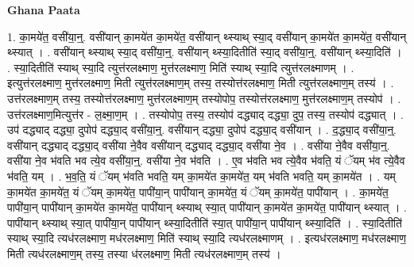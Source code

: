 \documentclass[17pt]{extarticle}
\begin{document}
\textbf{Ghana Paata } \newline

1. का॒मये॑त॒ वसी॑या॒न्॒. वसी॑यान् का॒मये॑त का॒मये॑त॒ वसी॑यान् थ्स्याथ् स्या॒द् वसी॑यान् का॒मये॑त का॒मये॑त॒ वसी॑यान् थ्स्यात् । . वसी॑यान् थ्स्याथ् स्या॒द् वसी॑या॒न्॒. वसी॑यान् थ्स्या॒दितीति॑ स्या॒द् वसी॑या॒न्॒. वसी॑यान् थ्स्या॒दिति॑ । . स्या॒दितीति॑ स्याथ् स्या॒दि त्युत्त॑रलक्ष्माण॒ मुत्त॑रलक्ष्माण॒ मिति॑ स्याथ् स्या॒दि त्युत्त॑रलक्ष्माणम् । . इत्युत्त॑रलक्ष्माण॒ मुत्त॑रलक्ष्माण॒ मिती त्युत्त॑रलक्ष्माण॒म् तस्य॒ तस्योत्त॑रलक्ष्माण॒ मिती त्युत्त॑रलक्ष्माण॒म् तस्य॑ । . उत्त॑रलक्ष्माण॒म् तस्य॒ तस्योत्त॑रलक्ष्माण॒ मुत्त॑रलक्ष्माण॒म् तस्योपोप॒ तस्योत्त॑रलक्ष्माण॒ मुत्त॑रलक्ष्माण॒म् तस्योप॑ । . उत्त॑रलक्ष्माण॒मित्युत्त॑र - ल॒क्ष्मा॒ण॒म् । . तस्योपोप॒ तस्य॒ तस्योप॑ दद्ध्याद् दद्ध्या॒ दुप॒ तस्य॒ तस्योप॑ दद्ध्यात् । . उप॑ दद्ध्याद् दद्ध्या॒ दुपोप॑ दद्ध्या॒द् वसी॑या॒न्॒. वसी॑यान् दद्ध्या॒ दुपोप॑ दद्ध्या॒द् वसी॑यान् । . द॒द्ध्या॒द् वसी॑या॒न्॒. वसी॑यान् दद्ध्याद् दद्ध्या॒द् वसी॑या ने॒वैव वसी॑यान् दद्ध्याद् दद्ध्या॒द् वसी॑या ने॒व । . वसी॑या ने॒वैव वसी॑या॒न्॒. वसी॑या ने॒व भ॑वति भव त्ये॒व वसी॑या॒न्॒. वसी॑या ने॒व भ॑वति । . ए॒व भ॑वति भव त्ये॒वैव भ॑वति॒ यं ॅयम् भ॑व त्ये॒वैव भ॑वति॒ यम् । . भ॒व॒ति॒ यं ॅयम् भ॑वति भवति॒ यम् का॒मये॑त का॒मये॑त॒ यम् भ॑वति भवति॒ यम् का॒मये॑त । . यम् का॒मये॑त का॒मये॑त॒ यं ॅयम् का॒मये॑त॒ पापी॑या॒न् पापी॑यान् का॒मये॑त॒ यं ॅयम् का॒मये॑त॒ पापी॑यान् । . का॒मये॑त॒ पापी॑या॒न् पापी॑यान् का॒मये॑त का॒मये॑त॒ पापी॑यान् थ्स्याथ् स्या॒त् पापी॑यान् का॒मये॑त का॒मये॑त॒ पापी॑यान् थ्स्यात् । . पापी॑यान् थ्स्याथ् स्या॒त् पापी॑या॒न् पापी॑यान् थ्स्या॒दितीति॑ स्या॒त् पापी॑या॒न् पापी॑यान् थ्स्या॒दिति॑ । . स्या॒दितीति॑ स्याथ् स्या॒दि त्यध॑रलक्ष्माण॒ मध॑रलक्ष्माण॒ मिति॑ स्याथ् स्या॒दि त्यध॑रलक्ष्माणम् । . इत्यध॑रलक्ष्माण॒ मध॑रलक्ष्माण॒ मिती त्यध॑रलक्ष्माण॒म् तस्य॒ तस्या ध॑रलक्ष्माण॒ मिती त्यध॑रलक्ष्माण॒म् तस्य॑ । \newline
\end{document}
